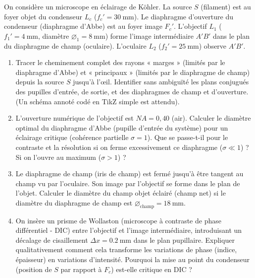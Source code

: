 \documentclass[11pt]{article}
\begin{document}
\begin{exercice}
On considère un microscope en éclairage de Köhler. La source $S$ (filament) est au foyer objet du condenseur $L_c$ ($f_c' = \SI{30}{\milli\metre}$). Le diaphragme d'ouverture du condenseur (diaphragme d'Abbe) est au foyer image $F_c'$. L'objectif $L_1$ ($f_1' = \SI{4}{\milli\metre}$, diamètre $\varnothing_1 = \SI{8}{\milli\metre}$) forme l'image intermédiaire $A'B'$ dans le plan du diaphragme de champ (oculaire). L'oculaire $L_2$ ($f_2' = \SI{25}{\milli\metre}$) observe $A'B'$.
\begin{enumerate}
    \item Tracer le cheminement complet des rayons « marges » (limités par le diaphragme d'Abbe) et « principaux » (limités par le diaphragme de champ) depuis la source $S$ jusqu'à l'œil. Identifier sans ambiguïté les plans conjugués des pupilles d'entrée, de sortie, et des diaphragmes de champ et d'ouverture. (Un schéma annoté codé en TikZ simple est attendu).
    \item L'ouverture numérique de l'objectif est $NA = 0,40$ (air). Calculer le diamètre optimal du diaphragme d'Abbe (pupille d'entrée du système) pour un éclairage critique (cohérence partielle $\sigma = 1$). Que se passe-t-il pour le contraste et la résolution si on ferme excessivement ce diaphragme ($\sigma \ll 1$) ? Si on l'ouvre au maximum ($\sigma > 1$) ?
    \item Le diaphragme de champ (iris de champ) est fermé jusqu'à être tangent au champ vu par l'oculaire. Son image par l'objectif se forme dans le plan de l'objet. Calculer le diamètre du champ objet éclairé (champ net) si le diamètre du diaphragme de champ est $\varnothing_{\text{champ}} = \SI{18}{\milli\metre}$.
    \item On insère un prisme de Wollaston (microscope à contraste de phase différentiel - DIC) entre l'objectif et l'image intermédiaire, introduisant un décalage de cisaillement $\Delta x = \SI{0,2}{\milli\metre}$ dans le plan pupillaire. Expliquer qualitativement comment cela transforme les variations de phase (indice, épaisseur) en variations d'intensité. Pourquoi la mise au point du condenseur (position de $S$ par rapport à $F_c$) est-elle critique en DIC ?
\end{enumerate}
\end{exercice}
\end{document}
